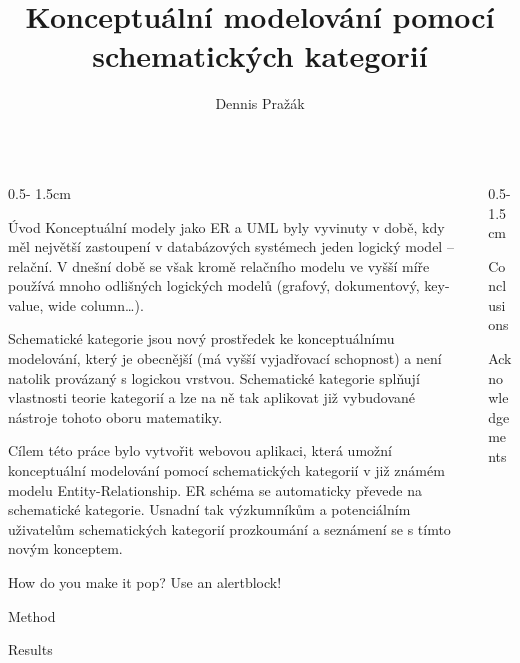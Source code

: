 \documentclass[a0paper]{uioposter}
\title{Konceptuální modelování pomocí schematických kategorií}
\author {Dennis Pražák}
\begin{document}
\begin{frame}
  \begin{columns}[onlytextwidth]


    \begin{column}{0.5\textwidth - 1.5cm}
      \begin{block}{Úvod}
        Konceptuální modely jako ER a UML byly vyvinuty v době, kdy měl největší zastoupení v databázových systémech jeden logický model -- relační.
        V dnešní době se však kromě relačního modelu ve vyšší míře používá mnoho odlišných logických modelů (grafový, dokumentový, key-value, wide column\dots).

        \alert{Schematické kategorie} jsou nový prostředek ke konceptuálnímu modelování, který je obecnější (má vyšší vyjadřovací schopnost) a není natolik provázaný s logickou vrstvou.
        Schematické kategorie splňují vlastnosti teorie kategorií a lze na ně tak aplikovat již vybudované nástroje tohoto oboru matematiky.

        Cílem této práce bylo vytvořit webovou aplikaci, která umožní konceptuální modelování pomocí schematických kategorií v již známém modelu Entity-Relationship.
        ER schéma se automaticky převede na schematické kategorie.
        Usnadní tak výzkumníkům a potenciálním uživatelům schematických kategorií prozkoumání a seznámení se s tímto novým konceptem.
      \end{block}

      \begin{alertblock}{How do you make it pop?}
        Use an \alert{alertblock}!
      \end{alertblock}

      \begin{block}{Method}
        \lipsum[1]
      \end{block}

      \begin{block}{Results}
        \lipsum[2]
        \unskip
      \end{block}
    \end{column}


    \begin{column}{0.5\textwidth - 1.5cm}
      \begin{block}{Conclusions}
        \lipsum[4]
      \end{block}

      \begin{block}{Acknowledgements}
        \lipsum[5]
      \end{block}


\end{column}
\end{columns}
\end{frame}
\end{document}
